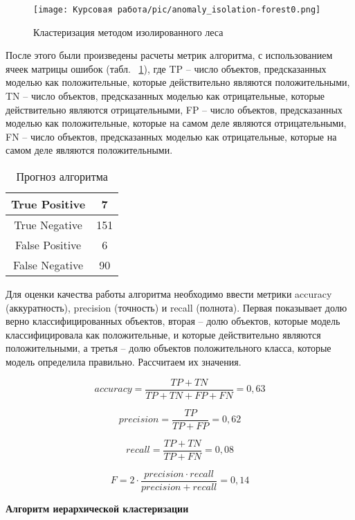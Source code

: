 \begin{figure}[!ht]
    \texttt{[image: Курсовая работа/pic/anomaly\_isolation-forest0.png]}
    \caption{Кластеризация методом изолированного леса}
    \label{ris:isolation-forest}
\end{figure}

После этого были произведены расчеты метрик алгоритма, с использованием ячеек матрицы ошибок (табл. ~\ref{tabular:tableIsolationForest}), где TP – число объектов, предсказанных моделью как положительные, которые действительно являются положительными, TN – число объектов, предсказанных моделью как отрицательные, которые действительно являются отрицательными, FP – число объектов, предсказанных моделью как положительные, которые на самом деле являются отрицательными, FN – число объектов, предсказанных моделью как отрицательные, которые на самом деле являются положительными. 

\begin{table}[!ht]
    \onehalfspacing \caption{Прогноз алгоритма}
    \medskip
        \begin{tabular}{|c|c|}
        \hline
            True Positive & 7\\  \hline 
            True Negative & 151\\  \hline 
            False Positive & 6\\  \hline 
            False Negative & 90\\  \hline 
        \end{tabular}
    \label{tabular:tableIsolationForest}
\end{table}

Для оценки качества работы алгоритма необходимо ввести метрики accuracy (аккуратность), precision (точность) и recall (полнота). Первая показывает долю верно классифицированных объектов, вторая – долю объектов, которые модель классифицировала как положительные, и которые действительно являются положительными, а третья – долю объектов положительного класса, которые модель определила правильно. Рассчитаем их значения.

$$
accuracy = \frac{TP+TN}{TP+TN+FP+FN} = 0,63
$$

$$
precision = \frac{TP}{TP+FP} =  0,62
$$

$$
recall = \frac{TP+TN}{TP+FN} = 0,08
$$

$$
F = 2\cdot \frac{precision \cdot recall}{precision+recall} = 0,14
$$

\vspace{1.5em}
\textbf{Алгоритм иерархической кластеризации}

